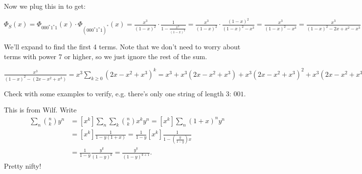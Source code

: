 \begin{enumerate}
Now we plug this in to get:

\begin{center}
    $\Phi_{S}(x) = \Phi_{000^*1^*1}(x) \cdot \Phi_{(000^*1^*1)^*}(x) = \frac{x^3}{(1 - x)^2} \cdot \frac{1}{1 - \frac{x^3}{(1 - x)^2}} = \frac{x^3}{(1 - x)^2} \cdot \frac{(1 - x)^2}{(1 - x)^2 - x^3} = \frac{x^3}{(1-x)^2 - x^3} = \frac{x^3}{(1-x)^2 - 2x + x^2 - x^3} = \frac{x^3}{(1-x)^2 - (2x - x^2 + x^3)}$
\end{center}

We'll expand to find the first 4 terms. Note that we don't need to worry about terms with power 7 or higher, so we just ignore the rest of the sum.

\begin{center}
    $\frac{x^3}{(1-x)^2 - (2x - x^2 + x^3)} = x^3 \sum_{k \ge 0}(2x - x^2 + x^3)^k = x^3 + x^3(2x - x^2 + x^3) + x^3(2x - x^2 +x^3)^2 + x^3(2x - x^2 + x^3)^3 + x^3\sum_{k \ge 4}(2x - x^2 + x^3)^k = x^3 + 2x^4 - x^5 + x^6 + x^3(4x^2 - 2x^3 + 2x^4 - 2x^3 + x^4 - x^5 + 2x^4 - x^5 + x^6) + x^3(8x^3 + \cdots ) + \cdots = x^3 + 2x^4 + 3x^5 + 5x^6 + \cdots$
\end{center}

Check with some examples to verify, e.g. there's only one string of length 3: $001$.


     This is from Wilf.
    Write
    \begin{align*}
        \sum_n \binom{n}{k} y^n &= [x^k]\sum_n \sum_k \binom{n}{k} x^k y^n = [x^k]\sum_n (1+x)^n y^n\\
        &= [x^k] \frac{1}{1-y(1+x)} = \frac{1}{1-y}[x^k] \frac{1}{1-( \tfrac{y}{1-y} )x}\\
        &= \frac{1}{1-y} \frac{y^k}{(1-y)^k} = \frac{y^k}{(1-y)^{k+1}}.
    \end{align*}
    Pretty nifty!
\end{enumerate}